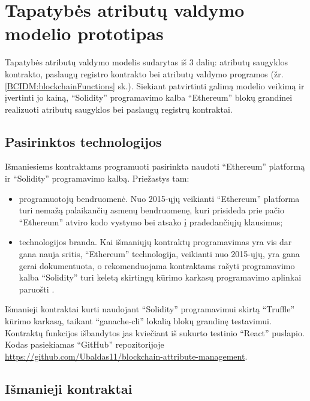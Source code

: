 \section{Tapatybės atributų valdymo modelio prototipas}

Tapatybės atributų valdymo modelis sudarytas iš 3 dalių: atributų saugyklos kontrakto, paslaugų registro kontrakto bei
atributų valdymo programos (žr. \hypertarget{BCIDM:blockchainFunctions}{\ref{BCIDM:blockchainFunctions}} sk.).
Siekiant patvirtinti galimą modelio veikimą ir įvertinti jo kainą, \enquote{Solidity} programavimo kalba \enquote{Ethereum} blokų grandinei
realizuoti atributų saugyklos bei paslaugų registrų kontraktai. 

\subsection{Pasirinktos technologijos}

Išmaniesiems kontraktams programuoti pasirinkta naudoti \enquote{Ethereum} platformą ir \enquote{Solidity} programavimo
kalbą. Priežastys tam:

\begin{itemize}
    \item programuotojų bendruomenė. Nuo 2015-ųjų veikianti \enquote{Ethereum} platforma turi nemažą
    palaikančių asmenų bendruomenę, kuri prisideda prie pačio \enquote{Ethereum} atviro kodo vystymo
    bei atsako į pradedančiųjų klausimus;
    \item technologijos branda. Kai išmaniųjų kontraktų programavimas yra vis dar gana nauja sritis,
    \enquote{Ethereum} technologija, veikianti nuo 2015-ųjų, yra gana gerai dokumentuota, o rekomenduojama kontraktams rašyti programavimo kalba
    \enquote{Solidity} \cite{Ethereum} turi keletą skirtingų kūrimo karkasų programavimo aplinkai paruošti \cite{SolidityDocumentation}.
\end{itemize}

Išmanieji kontraktai kurti naudojant \enquote{Solidity} programavimui skirtą \enquote{Truffle} kūrimo karkasą,
taikant \enquote{ganache-cli} lokalią blokų grandinę testavimui. Kontraktų funkcijos išbandytos jas kviečiant iš sukurto testinio
\enquote{React} puslapio. Kodas pasiekiamas \enquote{GitHub} repozitorijoje
\url{https://github.com/Ubaldas11/blockchain-attribute-management}.

\subsection{Išmanieji kontraktai}

